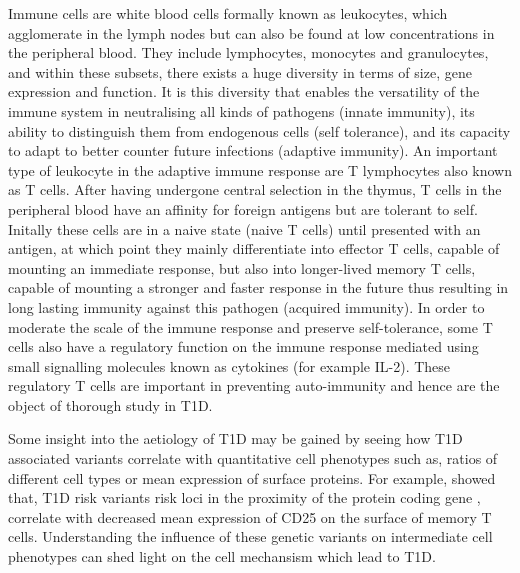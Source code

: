 Immune cells are white blood cells formally known as leukocytes, which agglomerate in the lymph nodes but can also be found at low concentrations in the peripheral blood.
They include lymphocytes, monocytes and granulocytes, and within these subsets, there exists a huge diversity in terms of size, gene expression and function.
It is this diversity that enables the versatility of the immune system in neutralising all kinds of pathogens (innate immunity),
its ability to distinguish them from endogenous cells (self tolerance),
and its capacity to adapt to better counter future infections (adaptive immunity).
An important type of leukocyte in the adaptive immune response are T lymphocytes also known as T cells.
After having undergone central selection in the thymus,
T cells in the peripheral blood have an affinity for foreign antigens but are tolerant to self.
Initally these cells are in a naive state (naive T cells) until presented with an antigen,
at which point they mainly differentiate into effector T cells, capable of mounting an immediate response,
but also into longer-lived memory T cells, capable of mounting a stronger and faster response in the future thus
resulting in long lasting immunity against this pathogen (acquired immunity).
In order to moderate the scale of the immune response and preserve self-tolerance, some T cells also have a regulatory function on the immune response
mediated using small signalling molecules known as cytokines (for example \acrfull{IL-2}).
These regulatory T cells are important in preventing auto-immunity and hence are the object of thorough study in T1D.

Some insight into the aetiology of T1D may be gained by seeing how T1D associated variants correlate with quantitative cell phenotypes such as, 
ratios of different cell types or mean expression of surface proteins.
For example, \citet{Dendrou:2009dv} showed that, T1D risk variants risk loci in the proximity of the protein coding gene ,
correlate with decreased mean expression of CD25 on the surface of memory T cells.
Understanding the influence of these genetic variants on intermediate cell phenotypes can shed light on the cell mechansism which lead to T1D.


